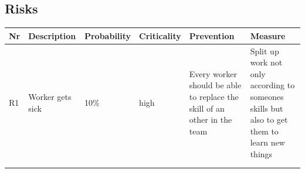 \documentclass{article}
\begin{document}
\subsection{Risks}
\begin{table}[htb!]
\begin{tabularx}{\textwidth}{llllXX}
\textbf{Nr} & \textbf{Description} & \textbf{Probability} & \textbf{Criticality} & \textbf{Prevention}                                                      & \textbf{Measure}                                                                             \\
\hline
R1          & Worker gets sick     & 10\%                 & high                 & Every worker should be able to replace the skill of an other in the team & Split up work not only according to someones skills but also to get them to learn new things \\
            &                      &                      &                      &                                                                          &                                                                                              \\
            &                      &                      &                      &                                                                          &                                                                                             
\end{tabularx}
\end{table}
\end{document}
